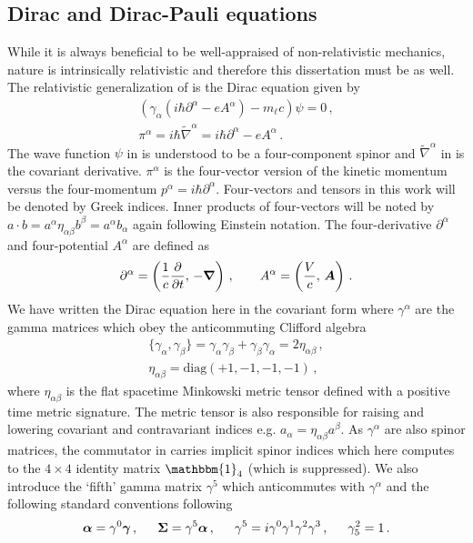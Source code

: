 \subsection{Dirac and Dirac-Pauli equations}
\label{sec:dp}
\noindent While it is always beneficial to be well-appraised of non-relativistic mechanics, nature is intrinsically relativistic and therefore this dissertation must be as well. The relativistic generalization of  is the Dirac equation given by
\begin{gather}
    \label{dirac:1a}
    \left(\gamma_{\alpha}\left(i\hbar\partial^{\alpha} - eA^{\alpha}\right)-m_{\ell}c\right)\psi=0\,,\\
    \label{dirac:1b}
    \pi^{\alpha}=i\hbar{\widetilde\nabla}^{\alpha}=i\hbar\partial^{\alpha}-eA^{\alpha}\,.
\end{gather}
The wave function $\psi$ in  is understood to be a four-component spinor and $\widetilde\nabla^{\alpha}$ in  is the covariant derivative. $\pi^{\alpha}$ is the four-vector version of the kinetic momentum versus the four-momentum $p^{\alpha}=i\hbar\partial^{\alpha}$. Four-vectors and tensors in this work will be denoted by Greek indices. Inner products of four-vectors will be noted by $a\cdot b=a^{\alpha}\eta_{\alpha\beta}b^{\beta}=a^{\alpha}b_{\alpha}$ again following Einstein notation. The four-derivative $\partial^{\alpha}$ and four-potential $A^{\alpha}$ are defined as
\begin{gather}
    \label{dirac:2}
    \partial^{\alpha}=\left(\frac{1}{c}\frac{\partial}{\partial t},\,-\boldsymbol{\nabla}\right)\,,\qquad A^{\alpha}=\left(\frac{V}{c},\,\boldsymbol{A}\right)\,.
\end{gather}
We have written the Dirac equation here in the covariant form where $\gamma^{\alpha}$ are the gamma matrices which obey the anticommuting Clifford algebra
\begin{gather}
    \label{gamma:1}
    \{\gamma_{\alpha},\gamma_{\beta}\}=\gamma_{\alpha}\gamma_{\beta} + \gamma_{\beta}\gamma_{\alpha} = 2\eta_{\alpha\beta}\,,\\
    \eta_{\alpha\beta}=\mathrm{diag}(+1,-1,-1,-1)\,,
\end{gather}
where $\eta_{\alpha\beta}$ is the flat spacetime Minkowski metric tensor defined with a positive time metric signature. The metric tensor is also responsible for raising and lowering covariant and contravariant indices e.g. $a_{\alpha}=\eta_{\alpha\beta}a^{\beta}$. As $\gamma^{\alpha}$ are also spinor matrices, the commutator in  carries implicit spinor indices which here computes to the $4\times4$ identity matrix $\mathbbm{1}_{4}$ (which is suppressed). We also introduce the `fifth' gamma matrix $\gamma^{5}$ which anticommutes with $\gamma^{\alpha}$ and the following standard conventions following~\cite{Itzykson:1980rh}
\begin{alignat}{1}
	\label{conventions:1} \bb{\alpha}=\gamma^{0}\bb{\gamma}\,,\indent \bb{\Sigma}=\gamma^{5}\bb{\alpha}\,,\indent \gamma^{5}=i\gamma^{0}\gamma^{1}\gamma^{2}\gamma^{3}\,,\indent \gamma^{2}_{5}=1\,.
\end{alignat}

